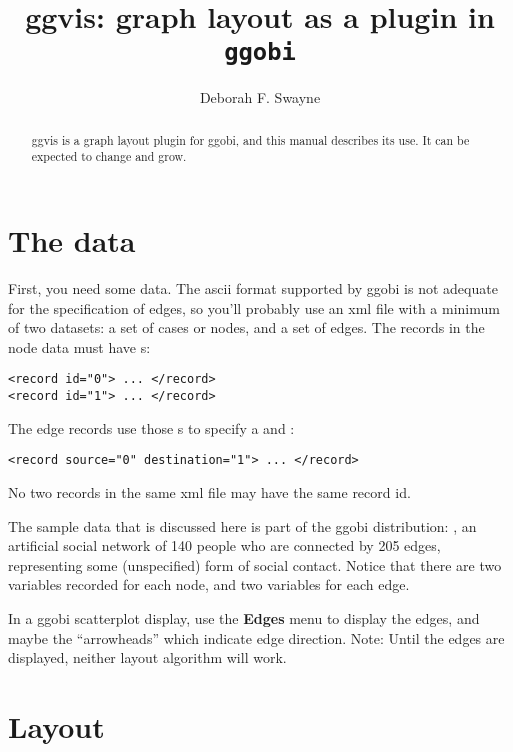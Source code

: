 \documentclass[11pt]{article}
\begin{document}
\title{ggvis: graph layout as a plugin in {\tt ggobi}}
\author{Deborah F. Swayne}
\date{}
\maketitle

\begin{abstract}
ggvis is a graph layout plugin for ggobi, and this manual
describes its use.  It can be expected to change and grow.
\end{abstract}

\section{The data}

First, you need some data.  The ascii format supported by ggobi is not
adequate for the specification of edges, so you'll probably use an xml
file with a minimum of two datasets:  a set of cases or nodes, and a set
of edges.  The records in the node data must have
s:

\begin{verbatim}
<record id="0"> ... </record>
<record id="1"> ... </record>
\end{verbatim}

The edge records use those s to specify a
 and :

\begin{verbatim}
<record source="0" destination="1"> ... </record>
\end{verbatim}

No two records in the same xml file may have the same record id.

The sample data that is discussed here is part of the ggobi distribution:
, an artificial social network of 140 people who are
connected by 205 edges, representing some (unspecified) form of social
contact.  Notice that there are two variables recorded for each node,
and two variables for each edge.

In a ggobi scatterplot display, use the {\bf Edges} menu to
display the edges, and maybe the ``arrowheads'' which indicate
edge direction.  Note: Until the edges are displayed, neither layout
algorithm will work.

\section{Layout}
\end{document}
